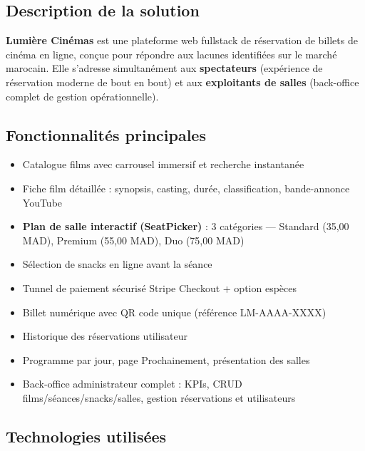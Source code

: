 \documentclass[12pt,a4paper,openany]{report}
\begin{document}
\subsection{Description de la solution}

\textbf{Lumière Cinémas} est une plateforme web fullstack de réservation de billets de cinéma en ligne, conçue pour répondre aux lacunes identifiées sur le marché marocain. Elle s'adresse simultanément aux \textbf{spectateurs} (expérience de réservation moderne de bout en bout) et aux \textbf{exploitants de salles} (back-office complet de gestion opérationnelle).

\subsection{Fonctionnalités principales}

\begin{itemize}
  \item Catalogue films avec carrousel immersif et recherche instantanée
  \item Fiche film détaillée : synopsis, casting, durée, classification, bande-annonce YouTube
  \item \textbf{Plan de salle interactif (SeatPicker)} : 3 catégories — Standard (35,00 MAD), Premium (55,00 MAD), Duo (75,00 MAD)
  \item Sélection de snacks en ligne avant la séance
  \item Tunnel de paiement sécurisé Stripe Checkout + option espèces
  \item Billet numérique avec QR code unique (référence LM-AAAA-XXXX)
  \item Historique des réservations utilisateur
  \item Programme par jour, page Prochainement, présentation des salles
  \item Back-office administrateur complet : KPIs, CRUD films/séances/snacks/salles, gestion réservations et utilisateurs
\end{itemize}

\subsection{Technologies utilisées}
\end{document}
